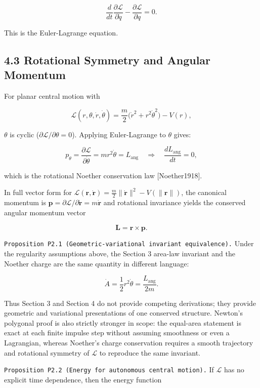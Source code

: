 \documentclass[
]{article}
\begin{document}
\[
\frac{d}{dt}\frac{\partial\mathcal L}{\partial\dot q}
-\frac{\partial\mathcal L}{\partial q}
=0.
\]

This is the Euler-Lagrange equation.

\hypertarget{rotational-symmetry-and-angular-momentum}{%
\subsection{4.3 Rotational Symmetry and Angular
Momentum}\label{rotational-symmetry-and-angular-momentum}}

For planar central motion with

\[
\mathcal L(r,\theta,\dot r,\dot\theta)=
\frac{m}{2}\big(\dot r^2+r^2\dot\theta^2\big)-V(r),
\]

\(\theta\) is cyclic (\(\partial\mathcal L/\partial\theta=0\)). Applying
Euler-Lagrange to \(\theta\) gives:

\[
p_\theta=\frac{\partial\mathcal L}{\partial\dot\theta}=m r^2\dot\theta
=L_{\mathrm{ang}}
\quad\Rightarrow\quad
\frac{dL_{\mathrm{ang}}}{dt}=0,
\]

which is the rotational Noether conservation law {[}Noether1918{]}.

In full vector form for
\(\mathcal L(\mathbf r,\dot{\mathbf r})=\frac{m}{2}\|\dot{\mathbf r}\|^2-V(\|\mathbf r\|)\),
the canonical momentum is
\(\mathbf p=\partial\mathcal L/\partial\dot{\mathbf r}=m\dot{\mathbf r}\)
and rotational invariance yields the conserved angular momentum vector

\[
\mathbf L=\mathbf r\times\mathbf p.
\]

\texttt{Proposition\ P2.1\ (Geometric-variational\ invariant\ equivalence).}
Under the regularity assumptions above, the Section 3 area-law invariant
and the Noether charge are the same quantity in different language:

\[
\dot A=\frac12 r^2\dot\theta=\frac{L_{\mathrm{ang}}}{2m}.
\]

Thus Section 3 and Section 4 do not provide competing derivations; they
provide geometric and variational presentations of one conserved
structure. Newton's polygonal proof is also strictly stronger in scope:
the equal-area statement is exact at each finite impulse step without
assuming smoothness or even a Lagrangian, whereas Noether's charge
conservation requires a smooth trajectory and rotational symmetry of
\(\mathcal L\) to reproduce the same invariant.

\texttt{Proposition\ P2.2\ (Energy\ for\ autonomous\ central\ motion).}
If \(\mathcal L\) has no explicit time dependence, then the energy
function
\end{document}
